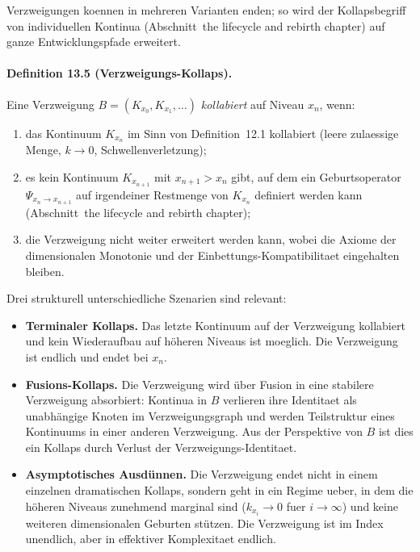 Verzweigungen koennen in mehreren Varianten enden; so wird der Kollapsbegriff von
individuellen Kontinua (Abschnitt~the lifecycle and rebirth chapter) auf ganze
Entwicklungspfade erweitert.

\paragraph{Definition 13.5 (Verzweigungs-Kollaps).}
Eine Verzweigung \(B = (K_{x_0}, K_{x_1}, \dots)\) \emph{kollabiert} auf Niveau
\(x_n\), wenn:
\begin{enumerate}
  \item das Kontinuum \(K_{x_n}\) im Sinn von Definition~12.1 kollabiert
        (leere zulaessige Menge, \(k\to 0\), Schwellenverletzung);
  \item es kein Kontinuum \(K_{x_{n+1}}\) mit \(x_{n+1}>x_n\) gibt, auf
        dem ein Geburtsoperator \(\Psi_{x_n\to x_{n+1}}\) auf irgendeiner Restmenge
        von \(K_{x_n}\) definiert werden kann
        (Abschnitt~the lifecycle and rebirth chapter);
  \item die Verzweigung nicht weiter erweitert werden kann, wobei die Axiome der
        dimensionalen Monotonie und der Einbettungs-Kompatibilitaet eingehalten
        bleiben.
\end{enumerate}

Drei strukturell unterschiedliche Szenarien sind relevant:

\begin{itemize}
  \item \textbf{Terminaler Kollaps.}\quad
        Das letzte Kontinuum auf der Verzweigung kollabiert und kein
        Wiederaufbau auf höheren Niveaus ist moeglich. Die Verzweigung ist
        endlich und endet bei \(x_n\).
  \item \textbf{Fusions-Kollaps.}\quad
        Die Verzweigung wird über Fusion in eine stabilere Verzweigung absorbiert:
        Kontinua in \(B\) verlieren ihre Identitaet als unabhängige Knoten im
        Verzweigungsgraph und werden Teilstruktur eines Kontinuums in einer
        anderen Verzweigung. Aus der Perspektive von \(B\) ist dies ein
        Kollaps durch Verlust der Verzweigungs-Identitaet.
  \item \textbf{Asymptotisches Ausdünnen.}\quad
        Die Verzweigung endet nicht in einem einzelnen dramatischen Kollaps,
        sondern geht in ein Regime ueber, in dem die höheren Niveaus zunehmend
        marginal sind (\(k_{x_i}\to 0\) fuer \(i\to\infty\)) und keine
        weiteren dimensionalen Geburten stützen. Die Verzweigung ist im Index
        unendlich, aber in effektiver Komplexitaet endlich.
\end{itemize}

